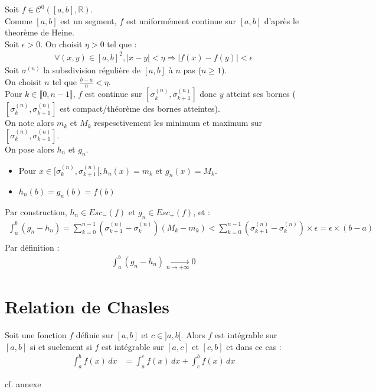\documentclass[../main.tex]{subfiles}
\begin{document}
\noindent Soit $f\in \mathcal{C}^0([a, b], \mathbb{R})$. \\
Comme $[a, b]$ est un segment, $f$ est uniformément continue sur $[a, b]$ d'après le theorème de Heine. \\
Soit $\epsilon > 0$. On choisit $\eta > 0$ tel que : 
\begin{align*}
    \forall (x, y) \in [a, b]^2, |x - y| < \eta \Rightarrow |f(x) - f(y)| < \epsilon
\end{align*}
Soit $\sigma^{(n)}$ la subsdivision régulière de $[a, b]$ à $n$ pas ($n \geq 1$). \\
On choisit $n$ tel que $\frac{b-a}{n} < \eta$. \\
Pour $k\in \llbracket 0, n-1 \rrbracket$, $f$ est continue sur $[\sigma_k^{(n)}, \sigma_{k+1}^{(n)}]$ donc $y$ atteint ses bornes ($[\sigma_k^{(n)}, \sigma_{k+1}^{(n)}]$ est compact/théorème des bornes atteintes). \\
On note alors $m_k$ et $M_k$ respesctivement les minimum et maximum sur $[\sigma_k^{(n)}, \sigma_{k+1}^{(n)}]$. \\
On pose alors $h_n$ et $g_n$. \\
\begin{itemize}
    \item Pour $x\in [\sigma_k^{(n)}, \sigma_{k+1}^{(n)}[, h_n(x) = m_k$ et $g_n(x) = M_k$. \\
    \item $h_n(b) = g_n(b) = f(b)$
\end{itemize}
Par construction, $h_n \in Esc_-(f)$ et $g_n \in Esc_+(f)$, et : 
\begin{align*}
    \int_{a}^{b} (g_n - h_n) = \sum_{k=0}^{n-1} (\sigma_{k+1}^{(n)} - \sigma_k^{(n)}) (M_k - m_k) < \sum_{k=0}^{n-1} (\sigma_{k+1}^{(n)} - \sigma_k^{(n)}) \times \epsilon = \epsilon \times (b - a) \\
\end{align*}
Par définition : 
\begin{align*}
    \int_{a}^{b} (g_n - h_n)  \underset{n \to +\infty}{\longrightarrow} 0
\end{align*}

\section{Relation de Chasles}
\begin{tcolorbox}[title=Propostion 26.46, title filled=false, colframe=lightblue, colback=lightblue!10!white]
    Soit une fonction $f$ définie sur $[a, b]$ et $c\in ]a, b[$. Alors $f$ est intégrable sur $[a, b]$ si et suelement si $f$ est intégrable sur $[a, c]$ et $[c, b]$ et dans ce cas : 
    \begin{align*}
        \int_{a}^{b} f(x) \,dx &= \int_{a}^{c} f(x) \,dx + \int_{c}^{b} f(x) \,dx
    \end{align*}
\end{tcolorbox}

\noindent cf. annexe
\end{document}

